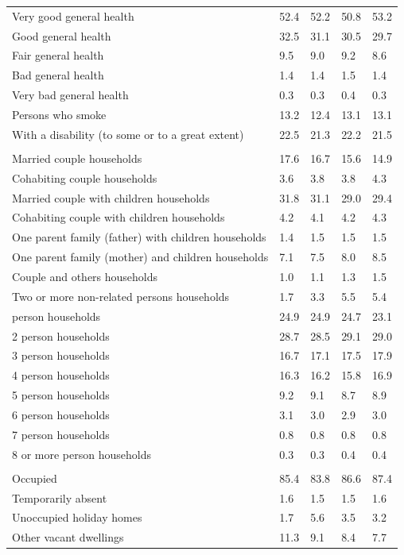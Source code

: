\documentclass{article}
\begin{document}
\begin{table}[h]
\begin{tabular}{KTTTT}
    \hline
Very good general health & 52.4& 52.2&50.8& 53.2\\
Good general health & 32.5& 31.1& 30.5& 29.7\\
Fair general health & 9.5& 9.0&9.2& 8.6\\
Bad general health & 1.4& 1.4&1.5& 1.4\\
Very bad general health & 0.3& 0.3&0.4& 0.3\\
    \hline
Persons who smoke & 13.2& 12.4&13.1& 13.1\\
    \hline
With a disability (to some or to a great extent) & 22.5& 21.3&22.2& 21.5\\
\hline
    \\ 
    \hline
Married couple households & 17.6& 16.7& 15.6& 14.9\\
Cohabiting couple households & 3.6& 3.8& 3.8& 4.3\\
Married couple with children households & 31.8& 31.1& 29.0& 29.4\\
Cohabiting couple with children households & 4.2& 4.1& 4.2& 4.3\\
One parent family (father) with  children households & 1.4& 1.5& 1.5& 1.5\\
One parent family (mother) and children households & 7.1& 7.5& 8.0& 8.5\\
Couple and others households  & 1.0& 1.1& 1.3& 1.5\\
Two or more non-related persons households & 1.7& 3.3& 5.5& 5.4\\
     person households & 24.9& 24.9& 24.7& 23.1\\
2 person households & 28.7& 28.5& 29.1& 29.0\\
3 person households & 16.7& 17.1& 17.5& 17.9\\
4 person households & 16.3& 16.2& 15.8& 16.9\\
5 person households & 9.2& 9.1& 8.7& 8.9\\
6 person households & 3.1& 3.0& 2.9& 3.0\\
7 person households & 0.8& 0.8& 0.8& 0.8\\
8 or more person households & 0.3& 0.3& 0.4& 0.4\\
\hline
    \\ 
    \hline
Occupied & 85.4& 83.8& 86.6& 87.4\\
Temporarily absent & 1.6& 1.5& 1.5& 1.6\\
Unoccupied holiday homes & 1.7& 5.6& 3.5& 3.2\\
Other vacant dwellings & 11.3&  9.1&  8.4&  7.7\\
\hline
\end{tabular}
\end{table}
\end{document}
